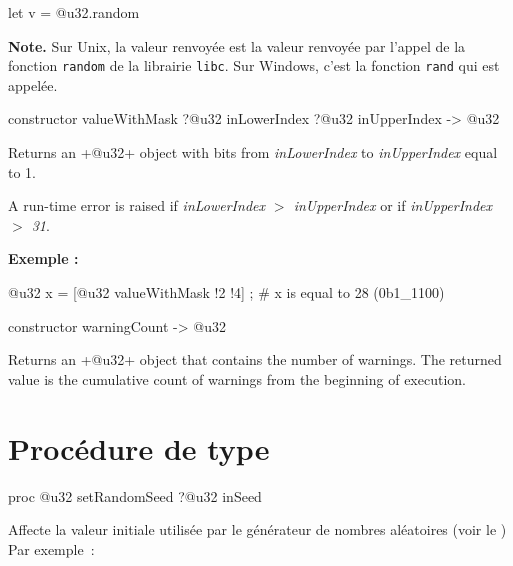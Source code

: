 \begin{galgas4}
  let v = @u32.random
\end{galgas4}


{\bf Note. } Sur Unix, la valeur renvoyée est la valeur renvoyée par l'appel de la fonction \texttt{random} de la librairie \texttt{libc}. Sur Windows, c'est la fonction \texttt{rand} qui est appelée.



\begin{galgas4}
constructor valueWithMask ?@u32 inLowerIndex ?@u32 inUpperIndex -> @u32
\end{galgas4}


Returns an \ggsq+@u32+ object with bits from \emph{inLowerIndex} to \emph{inUpperIndex} equal to 1.

A run-time error is raised if \emph{inLowerIndex $>$ inUpperIndex} or if \emph{inUpperIndex $>$ 31}.



\textbf{Exemple :}
\begin{galgas4}
@u32 x = [@u32 valueWithMask !2 !4] ; # x is equal to 28 (0b1_1100)
\end{galgas4}





\begin{galgas4}
constructor warningCount -> @u32
\end{galgas4}


Returns an \ggsq+@u32+ object that contains the number of warnings. The returned value is the cumulative count of warnings from the beginning of execution.





\section{Procédure de type}




\begin{galgas4box}
proc @u32 setRandomSeed ?@u32 inSeed
\end{galgas4box}

Affecte la valeur initiale utilisée par le générateur de nombres aléatoires (voir le ) Par exemple~:

\begin{galgas4}
  [@u32 setRandomSeed !0]
\end{galgas4}






